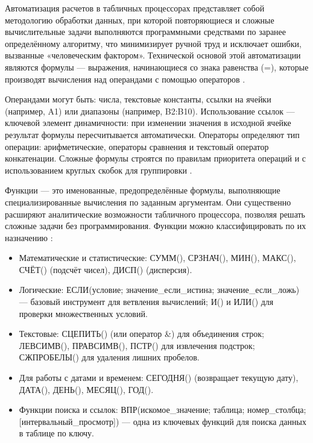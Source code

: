 \documentclass{SibFU-docs}
\begin{document}

Автоматизация расчетов в табличных процессорах представляет собой методологию обработки данных, при которой повторяющиеся и сложные вычислительные задачи выполняются программными средствами по заранее определённому алгоритму, что минимизирует ручной труд и исключает ошибки, вызванные «человеческим фактором». Технической основой этой автоматизации являются формулы --- выражения, начинающиеся со знака равенства (=), которые производят вычисления над операндами с помощью операторов \cite{microsoft2024, belenkiy2020}.

Операндами могут быть: числа, текстовые константы, ссылки на ячейки (например, A1) или диапазоны (например, B2:B10). Использование ссылок --- ключевой элемент динамичности: при изменении значения в исходной ячейке результат формулы пересчитывается автоматически. Операторы определяют тип операции: арифметические, операторы сравнения и текстовый оператор конкатенации. Сложные формулы строятся по правилам приоритета операций и с использованием круглых скобок для группировки \cite{saffr2019, habr2023}.


Функции --- это именованные, предопределённые формулы, выполняющие специализированные вычисления по заданным аргументам. Они существенно расширяют аналитические возможности табличного процессора, позволяя решать сложные задачи без программирования. Функции можно классифицировать по их назначению \cite{exceljet2024, googlesupport2024}:

\begin{itemize}[label=-]
\item Математические и статистические: СУММ(), СРЗНАЧ(), МИН(), МАКС(), СЧЁТ() (подсчёт чисел), ДИСП() (дисперсия).
\item Логические: ЕСЛИ(условие; значение\_если\_истина; значение\_если\_ложь) --- базовый инструмент для ветвления вычислений; И() и ИЛИ() для проверки множественных условий.
\item Текстовые: СЦЕПИТЬ() (или оператор \&) для объединения строк; ЛЕВСИМВ(), ПРАВСИМВ(), ПСТР() для извлечения подстрок; СЖПРОБЕЛЫ() для удаления лишних пробелов.
\item Для работы с датами и временем: СЕГОДНЯ() (возвращает текущую дату), ДАТА(), ДЕНЬ(), МЕСЯЦ(), ГОД().
\item Функции поиска и ссылок: ВПР(искомое\_значение; таблица; номер\_столбца; [интервальный\_просмотр]) --- одна из ключевых функций для поиска данных в таблице по ключу.
\end{itemize}
\end{document}
